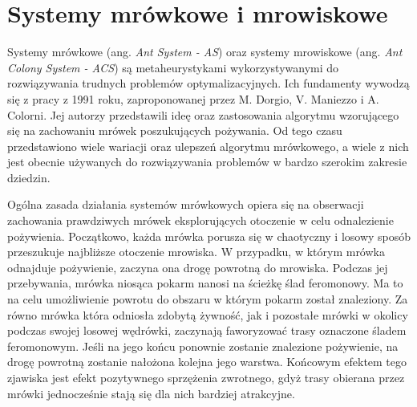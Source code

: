 \chapter{Systemy mrówkowe i mrowiskowe}\label{chap:antsys}
{

    Systemy mrówkowe (ang. \textit{Ant System - AS}) oraz systemy mrowiskowe (ang. \textit{Ant Colony System - ACS}) są
    metaheurystykami wykorzystywanymi do rozwiązywania trudnych problemów optymalizacyjnych. Ich fundamenty wywodzą się
    z pracy z 1991 roku, zaproponowanej przez M. Dorgio, V. Maniezzo i A. Colorni\cite{Dorigo1991AntSA}. Jej autorzy
    przedstawili ideę oraz zastosowania algorytmu wzorującego się na zachowaniu mrówek poszukujących pożywania. Od tego
    czasu przedstawiono wiele wariacji oraz ulepszeń algorytmu mrówkowego, a wiele z nich jest obecnie używanych do
    rozwiązywania problemów w bardzo szerokim zakresie dziedzin.

    Ogólna zasada działania systemów mrówkowych opiera się na obserwacji zachowania prawdziwych mrówek eksplorujących
    otoczenie w celu odnalezienie pożywienia. Początkowo, każda mrówka porusza się w chaotyczny i losowy sposób
    przeszukuje najbliższe otoczenie mrowiska. W przypadku, w którym mrówka odnajduje pożywienie, zaczyna ona drogę
    powrotną do mrowiska. Podczas jej przebywania, mrówka niosąca pokarm nanosi na ścieżkę ślad feromonowy. Ma to na
    celu umożliwienie powrotu do obszaru w którym pokarm został znaleziony. Za równo mrówka która odniosła zdobytą
    żywność, jak i pozostałe mrówki w okolicy podczas swojej losowej wędrówki, zaczynają faworyzować trasy oznaczone
    śladem feromonowym. Jeśli na jego końcu ponownie zostanie znalezione pożywienie, na drogę powrotną zostanie nałożona
    kolejna jego warstwa. Końcowym efektem tego zjawiska jest efekt pozytywnego sprzężenia zwrotnego, gdyż trasy
    obierana przez mrówki jednocześnie stają się dla nich bardziej atrakcyjne.

}
